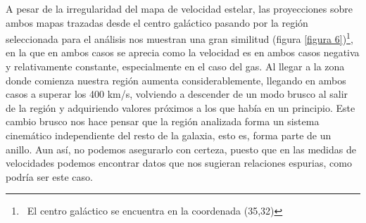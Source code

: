 \documentclass{article}
\begin{document}
A pesar de la irregularidad del mapa de velocidad estelar, las proyecciones sobre ambos mapas trazadas desde el centro galáctico pasando por la región seleccionada para el análisis nos muestran una gran similitud (figura \ref{figura 6})\footnote{\ El centro galáctico se encuentra en la coordenada (35,32)}, en la que en ambos casos se aprecia como la velocidad es en ambos casos negativa y relativamente constante, especialmente en el caso del gas. Al llegar a la zona donde comienza nuestra región aumenta considerablemente, llegando en ambos casos a superar los 400 km/s, volviendo a descender de un modo brusco al salir de la región y adquiriendo valores próximos a los que había en un principio. Este cambio brusco nos hace pensar que la región analizada forma un sistema cinemático independiente del resto de la galaxia, esto es, forma parte de un anillo. Aun así, no podemos asegurarlo con certeza, puesto que en las medidas de velocidades podemos encontrar datos que nos sugieran relaciones espurias, como podría ser este caso.
\end{document}
